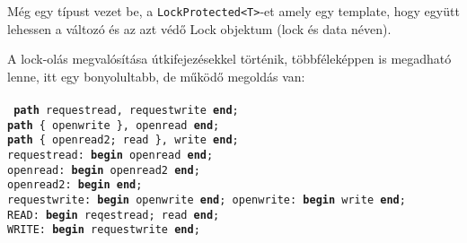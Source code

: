 \documentclass[fleqn,10pt,a4paper,titlepage]{article}
\begin{document}
  Még egy típust vezet be, a \texttt{LockProtected\textless T\textgreater}-et amely egy template, hogy együtt lehessen
  a változó és az azt védő Lock objektum (lock és data  néven).
  
  A lock-olás megvalósítása útkifejezésekkel történik, többféleképpen is megadható lenne, itt egy bonyolultabb, de
  működő megoldás van:\\\\
  \texttt{
     \textbf{path} requestread, requestwrite \textbf{end};\\
     \textbf{path} \{ openwrite \}, openread \textbf{end};\\
     \textbf{path} \{ openread2; read \}, write \textbf{end};\\
     requestread: \textbf{begin} openread \textbf{end};\\
     openread: \textbf{begin} openread2 \textbf{end};\\
     openread2: \textbf{begin} \textbf{end};\\
     requestwrite: \textbf{begin} openwrite \textbf{end};\
     openwrite: \textbf{begin} write \textbf{end};\\
     READ: \textbf{begin} reqestread; read \textbf{end};\\
     WRITE: \textbf{begin} requestwrite \textbf{end};
  }
  
  
\end{document}
